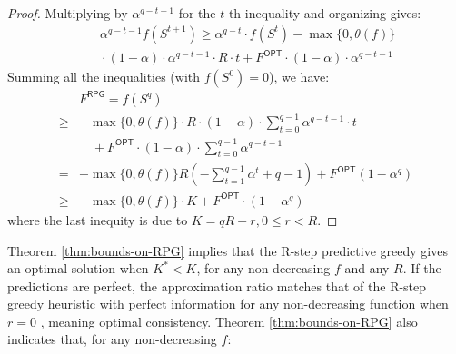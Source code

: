\begin{proof}
Multiplying by $\alpha^{q-t-1}$ for the $t$-th inequality and organizing gives: 
\begin{align*}
&\quad \alpha^{q-t-1} f(S^{t+1}) \geq \alpha^{q-t} \cdot f(S^t) - \max \{ 0, \theta(f) \} \\
&\quad \cdot (1 - \alpha) \cdot \alpha^{q-t-1} \cdot R \cdot t + F^{\textsf{OPT}} \cdot (1 - \alpha) \cdot \alpha^{q-t-1}
\end{align*}
Summing all the inequalities (with \( f(S^0) = 0 \)), we have:
\begin{align*}
&F^{\textsf{RPG}} = f(S^{q}) \\
\geq& - \max \{ 0, \theta(f) \} \cdot R \cdot (1 - \alpha) \cdot \sum_{t=0}^{q-1} \alpha^{q-t-1} \cdot t \\
&\quad + F^{\textsf{OPT}} \cdot (1 - \alpha) \cdot \sum_{t=0}^{q-1} \alpha^{q-t-1} \\
=& - \max \{ 0, \theta(f) \}  R \left(-\sum_{t=1}^{q-1} \alpha^t + q - 1\right) + F^{\textsf{OPT}} (1 - \alpha^q) \\
\geq& - \max \{ 0, \theta(f) \} \cdot K  + F^{\textsf{OPT}} \cdot (1 - \alpha^q)
\end{align*}
where the last inequity is due to $K = qR - r, 0 \leq r < R$. 
\end{proof}

Theorem \ref{thm:bounds-on-RPG} implies that the R-step predictive greedy gives an optimal solution when $K^* < K$, for any non-decreasing $f$ and any $R$. If the predictions are perfect, the approximation ratio matches that of the R-step greedy heuristic with perfect information for any non-decreasing function when $r = 0$ \cite{greedySubmodularFunctions}, meaning optimal consistency. Theorem \ref{thm:bounds-on-RPG} also indicates that, for any non-decreasing $f$:

